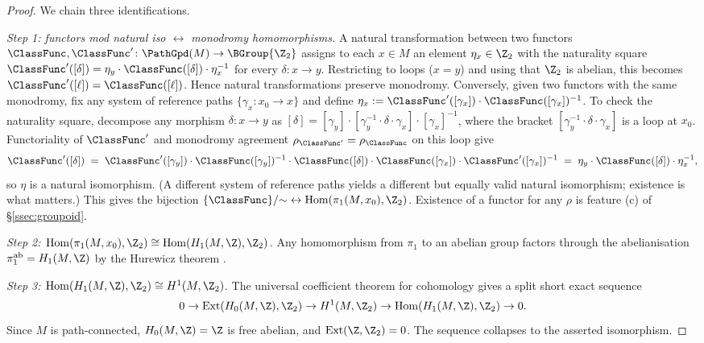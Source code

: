 \begin{proof}
We chain three identifications.

\emph{Step 1: functors mod natural iso $\leftrightarrow$ monodromy
homomorphisms.} A natural transformation between two functors
$\ClassFunc,\ClassFunc'\colon\PathGpd(M)\to\BGroup{\Z_2}$ assigns to
each $x\in M$ an element $\eta_x\in\Z_2$ with the naturality square
$\ClassFunc'([\delta])=\eta_y\cdot\ClassFunc([\delta])\cdot\eta_x^{-1}$
for every $\delta\colon x\to y$. Restricting to loops ($x=y$) and
using that $\Z_2$ is abelian, this becomes
$\ClassFunc'([\ell])=\ClassFunc([\ell])$. Hence natural
transformations preserve monodromy. Conversely, given two functors
with the same monodromy, fix any system of reference paths
$\{\gamma_x\colon x_0\to x\}$ and define
$\eta_x:=\ClassFunc'([\gamma_x])\cdot\ClassFunc([\gamma_x])^{-1}$. To
check the naturality square, decompose any morphism $\delta\colon
x\to y$ as $[\delta]=[\gamma_y]\cdot[\gamma_y^{-1}\cdot\delta\cdot
\gamma_x]\cdot[\gamma_x]^{-1}$, where the bracket
$[\gamma_y^{-1}\cdot\delta\cdot\gamma_x]$ is a loop at $x_0$.
Functoriality of $\ClassFunc'$ and monodromy agreement
$\rho_{\ClassFunc'}=\rho_{\ClassFunc}$ on this loop give
\[
   \ClassFunc'([\delta]) \;=\; \ClassFunc'([\gamma_y])\cdot
   \ClassFunc([\gamma_y])^{-1}\cdot\ClassFunc([\delta])\cdot
   \ClassFunc([\gamma_x])\cdot\ClassFunc'([\gamma_x])^{-1}
   \;=\; \eta_y\cdot\ClassFunc([\delta])\cdot\eta_x^{-1},
\]
so $\eta$ is a natural isomorphism. (A different system of reference
paths yields a different but equally valid natural isomorphism;
existence is what matters.) This gives the bijection
$\{\ClassFunc\}/{\sim}\leftrightarrow
\mathrm{Hom}(\pi_1(M,x_0),\Z_2)$. Existence of a functor for any
$\rho$ is feature (c) of \S\ref{ssec:groupoid}.

\emph{Step 2: $\mathrm{Hom}(\pi_1(M,x_0),\Z_2)\cong
\mathrm{Hom}(H_1(M,\Z),\Z_2)$.} Any homomorphism from $\pi_1$ to an
abelian group factors through the abelianisation
$\pi_1^{\mathrm{ab}}=H_1(M,\Z)$ by the Hurewicz theorem
\cite[Theorem~2A.1]{Hatcher}.

\emph{Step 3: $\mathrm{Hom}(H_1(M,\Z),\Z_2)\cong H^1(M,\Z_2)$.} The
universal coefficient theorem for cohomology
\cite[Theorem~3.2]{Hatcher} gives a split short
exact sequence
\[
  0 \to \mathrm{Ext}(H_0(M,\Z),\Z_2) \to H^1(M,\Z_2)
    \to \mathrm{Hom}(H_1(M,\Z),\Z_2) \to 0.
\]
Since $M$ is path-connected, $H_0(M,\Z)=\Z$ is free abelian, and
$\mathrm{Ext}(\Z,\Z_2)=0$. The sequence collapses to the asserted
isomorphism.
\end{proof}

